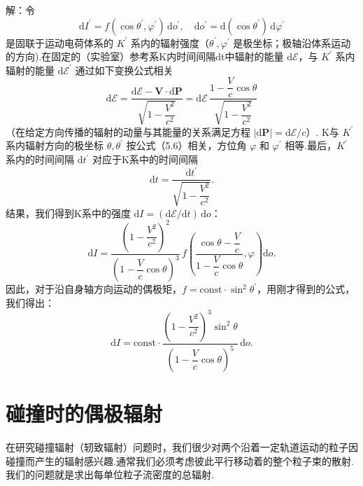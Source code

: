 \begin{xiti}
解：令
\begin{equation*}
  \mathrm{d}I^{\prime}=f(\cos\theta^{\prime},\varphi^{\prime})\,\mathrm{d}o^{\prime},\quad
  \mathrm{d}o^{\prime}=\mathrm{d}(\cos\theta^{\prime})\,\mathrm{d}\varphi^{\prime}
\end{equation*}
是固联于运动电荷体系的 $K^{\prime}$ 系内的辐射强度（$\theta^{\prime},\varphi^{\prime}$ 是极坐标；极轴沿体系运动的方向).在固定的（实验室）参考系K内时间间隔dt中辐射的能量 $\mathrm{d}\mathcal{E}$，与 $K^{\prime}$ 系内辐射的能量 $\mathrm{d}\mathcal{E}^{\prime}$ 通过如下变换公式相关
\begin{equation*}
  \mathrm{d}\mathcal{E}=\frac{\mathrm{d}\mathcal{E}-\boldsymbol{V}\cdot\mathrm{d}\boldsymbol{P}}{\sqrt{1-\dfrac{V^2}{c^2}}}=\mathrm{d}\mathcal{E}\,\frac{1-\dfrac{V}{c}\cos\theta}{\sqrt{1-\dfrac{V^2}{c^2}}}
\end{equation*}
（在给定方向传播的辐射的动量与其能量的关系满足方程 $|\mathrm{d}\boldsymbol{P}|=\mathrm{d}\mathcal{E}/c$）. K与 $K^{\prime}$ 系内辐射方向的极坐标 $\theta,\theta^{\prime}$ 按公式（5.6）相关，方位角 $\varphi$ 和 $\varphi^{\prime}$ 相等.最后，$K^{\prime}$ 系内的时间间隔 $\mathrm{d}t^{\prime}$ 对应于K系中的时间间隔
\begin{equation*}
  \mathrm{d}t=\frac{\mathrm{d}t^{\prime}}{\sqrt{1-\dfrac{V^2}{c^2}}}.
\end{equation*}
结果，我们得到K系中的强度 $\mathrm{d}I=(\mathrm{d}\mathcal{E}/\mathrm{d}t)\,\mathrm{d}o$：
\begin{equation*}
  \mathrm{d}I=\frac{\left(1-\dfrac{V^2}{c^2}\right)^2}{\left(1-\dfrac{V}{c}\cos\theta\right)^3}\,f\!\left(\frac{\cos\theta-\dfrac{V}{c}}{1-\dfrac{V}{c}\cos\theta},\varphi\right)\mathrm{d}o.
\end{equation*}
因此，对于沿自身轴方向运动的偶极矩，$f=\mathrm{const}\cdot\sin^2\theta^{\prime}$，用刚才得到的公式，我们得出：
\begin{equation*}
  \mathrm{d}I=\mathrm{const}\cdot\frac{\left(1-\dfrac{V^2}{c^2}\right)^3\sin^2\theta}{\left(1-\dfrac{V}{c}\cos\theta\right)^5}\,\mathrm{d}o.
\end{equation*}

\end{xiti}

\section{碰撞时的偶极辐射}

在研究碰撞辐射（轫致辐射）问题时，我们很少对两个沿着一定轨道运动的粒子因碰撞而产生的辐射感兴趣.通常我们必须考虑彼此平行移动着的整个粒子束的散射.我们的问题就是求出每单位粒子流密度的总辐射.


